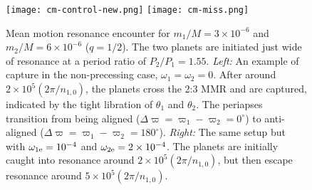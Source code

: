 \documentclass{article}
\begin{document}
\begin{figure}
    \centering
    \texttt{[image: cm-control-new.png]}
    \texttt{[image: cm-miss.png]}
    \caption{Mean motion resonance encounter for $m_1/M=3\times10^{-6}$ and $m_2/M=6\times10^{-6}$ ($q=1/2$). The two planets are initiated just wide of resonance at a period ratio of $P_2/P_1=1.55$.
    \textit{Left:} An example of capture in the non-precessing case, $\omega_1=\omega_2=0$. After around $2\times10^5(2\pi/n_{1,0})$, the planets cross the 2:3 MMR and are captured, indicated by the tight libration of $\theta_1$ and $\theta_2$. The periapses transition from being aligned ($\Delta\varpi=\varpi_1-\varpi_2=0^\circ$) to anti-aligned ($\Delta\varpi=\varpi_1-\varpi_2=180^\circ$).
    \textit{Right:} The same setup but with $\omega_{1\rm e}=10^{-4}$ and $\omega_{2\rm e}=2\times10^{-4}$. The planets are initially caught into resonance around $2\times10^5(2\pi/n_{1,0})$, but then escape resonance around $5\times10^5(2\pi/n_{1,0})$.
    }
    \label{fig:cm}
\end{figure}

\clearpage

\end{document}
